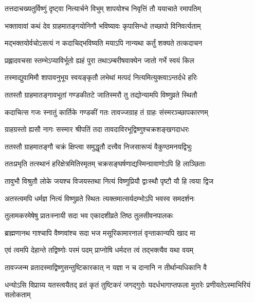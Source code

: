 \twolineshloka
{तत्तदाचख्यतुर्विष्णुं दृष्ट्वा नित्यार्चने विभुम्}
{शापयोश्च निवृत्तिं तौ ययाचाते रमापतिम्} %


\twolineshloka
{भक्तावावां कथं देव ग्राहमातङ्गयोनिगौ}
{भविष्यावः कृपासिन्धो तच्छापो विनिवर्त्यताम्} %


\twolineshloka
{मद्भक्तयोर्वचोऽसत्यं न कदाचिद्भविष्यति}
{मयाऽपि नान्यथा कर्तुं शक्यते तत्कदाचन} %

\twolineshloka
{प्रह्लादवचसा स्तम्भेऽप्याविर्भूतो ह्यहं पुरा}
{तथाऽम्बरीषवाक्येन जातो गर्भे स्वयं किल} %

\twolineshloka
{तस्माद्युवामिमौ शापावनुभूय स्वयङ्कृतौ}
{लभेथां मत्पदं नित्यमित्युक्त्वाऽन्तर्दधे हरिः} %

\twolineshloka
{ततस्तौ ग्राहमातङ्गावभूतां गण्डकीतटे}
{जातिस्मरौ तु तद्योन्यामपि विष्णुव्रते स्थितौ} %


\twolineshloka
{कदाचित्स गजः स्नातुं कार्तिके गण्डकीं गतः}
{तावज्जग्राह तं ग्राहः संस्मरञ्च्छापकारणम्} %

\twolineshloka
{ग्राहग्रस्तो ह्यसौ नागः सस्मार श्रीपतिं तदा}
{तावदाविरभूद्विष्णुश्चक्रशङ्खगदाधरः} %

\twolineshloka
{ततस्तौ ग्राहमातङ्गौ चक्रं क्षिप्त्वा समुद्धृतौ}
{दत्त्वैव निजसारूप्यं वैकुण्ठमनयद्विभुः} %

\twolineshloka
{ततःप्रभृति तत्स्थानं हरिक्षेत्रमितिस्मृतम्}
{चक्रसङ्घर्षणाद्यस्मिन्ग्रावाणोऽपि हि लाञ्छिताः} %

\twolineshloka
{तावुभौ विश्रुतौ लोके जयश्च विजयस्तथा}
{नित्यं विष्णुप्रियौ द्वाःस्थौ पृष्टौ यौ हि त्वया द्विज} %

\twolineshloka
{अतस्त्वमपि धर्मज्ञ नित्यं विष्णुव्रते स्थितः}
{त्यक्तमात्सर्यदम्भोऽपि भवस्व समदर्शनः} %

\twolineshloka
{तुलामकरमेषेषु प्रातःस्नायी सदा भव}
{एकादशीव्रते तिष्ठ तुलसीवनपालकः} %

\twolineshloka
{ब्राह्मणानथ गाश्चापि वैष्णवांश्च सदा भज}
{मसूरिकामारनालं वृन्ताकान्यपि खाद मा} %

\twolineshloka
{एवं त्वमपि देहान्ते तद्विष्णोः परमं पदम्}
{प्राप्नोषि धर्मदत्त त्वं तद्भक्त्यैव यथा वयम्} %

\twolineshloka
{तावज्जन्म व्रतादस्माद्विष्णुसन्तुष्टिकारकात्}
{न यज्ञा न च दानानि न तीर्थान्यधिकानि वै} %

\fourlineindentedshloka
{धन्योऽसि विप्राग्र्य यतस्त्वयैतद्}
{व्रतं कृतं तुष्टिकरं जगद्गुरोः}
{यदर्धभागाप्तफला मुरारेः}
{प्रणीयतेऽस्माभिरियं सलोकताम्} %


